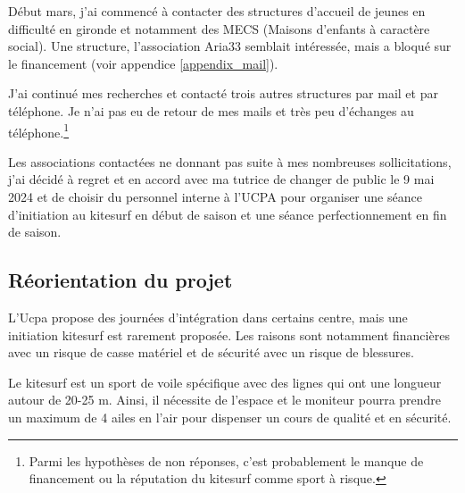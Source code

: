 \documentclass[11pt,a4paper]{report}
\begin{document}
Début mars, j'ai commencé à contacter des structures d'accueil de jeunes 
en difficulté en gironde et notamment des MECS (Maisons d'enfants à caractère social).
Une structure, l'association Aria33\cite{aria33} semblait 
intéressée, mais a bloqué sur le financement
(voir appendice \ref{appendix_mail}).

J'ai continué mes recherches et contacté trois autres structures
par mail et par téléphone. Je n'ai pas eu de retour de mes mails 
et très peu d'échanges au téléphone.\footnote{Parmi les hypothèses
de non réponses, c'est probablement le manque de financement ou
la réputation du kitesurf comme sport  à risque.}

Les associations contactées ne donnant pas  suite à mes nombreuses
sollicitations, j'ai décidé à regret et en accord avec ma tutrice
de changer de public le 9 mai 2024 et de choisir du personnel interne
à l'UCPA pour organiser une séance d'initiation au kitesurf en début 
de saison et une séance perfectionnement en fin de saison.

\subsection{Réorientation du projet\label{reorientation}}

L'Ucpa propose des journées d'intégration dans certains centre, mais
une initiation kitesurf est rarement proposée. Les raisons sont notamment
financières avec un risque de casse matériel et de sécurité avec un risque
de blessures.

Le kitesurf est un sport de voile spécifique avec des lignes  qui ont
une longueur autour de  20-25 m. Ainsi, il nécessite de l'espace
et le moniteur pourra prendre un maximum de 4 ailes en l'air
pour dispenser un cours de qualité et en sécurité. 
\end{document}
